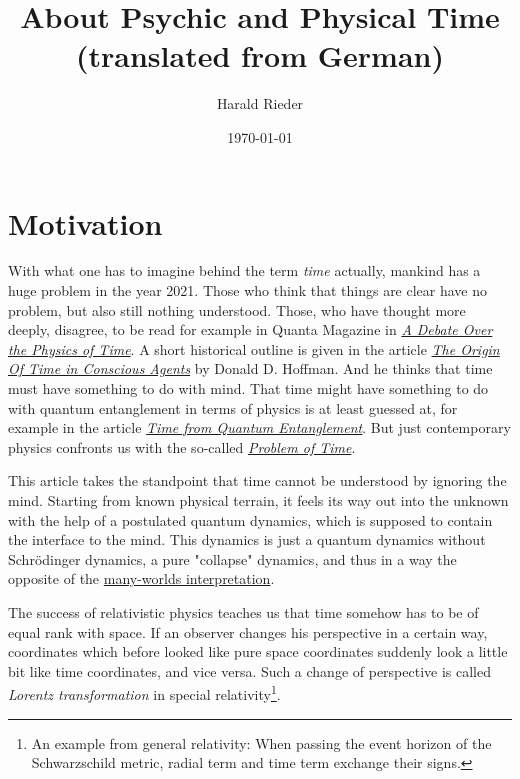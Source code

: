 \documentclass[12pt]{article}
\begin{document}
\title{\fontsize{25}{25}\selectfont \textbf{About Psychic and Physical Time} \\
\fontsize{12pt}{12pt}\selectfont (translated from German)}
\author{Harald Rieder}
\date{\today}
\maketitle



\tableofcontents

\section{Motivation}

With what one has to imagine behind the term \emph{time} actually, mankind has a huge problem in the year 2021. Those who think that things are clear have no problem, but also still nothing understood. Those, who have thought more deeply, disagree, to be read for example in Quanta Magazine in \emph{\href{https://www.quantamagazine.org/a-debate-over-the-physics-of-time-20160719/}{A Debate Over the Physics of Time}}. A short historical outline is given in the article \emph{\href{http://cogsci.uci.edu/~ddhoff/HoffmanTime.pdf}{The Origin Of Time in Conscious Agents}} by Donald D. Hoffman. And he thinks that time must have something to do with mind. That time might have something to do with quantum entanglement in terms of physics is at least guessed at, for example in the article \emph{\href{https://arxiv.org/abs/1310.4691}{Time from Quantum Entanglement}}. But just contemporary physics confronts us with the so-called \emph{\href{https://en.wikipedia.org/wiki/Problem_of_time}{Problem of Time}}. 

This article takes the standpoint that time cannot be understood by ignoring the mind. Starting from known physical terrain, it feels its way out into the unknown with the help of a postulated quantum dynamics, which is supposed to contain the interface to the mind. This dynamics is just a quantum dynamics without Schrödinger dynamics, a pure "collapse" dynamics, and thus in a way the opposite of the \href{https://en.wikipedia.org/wiki/Many-worlds_interpretation}{many-worlds interpretation}.

The success of relativistic physics teaches us that time somehow has to be of equal rank with space. If an observer changes his perspective in a certain way, coordinates which before looked like pure space coordinates suddenly look a little bit like time coordinates, and vice versa. Such a change of perspective is called \emph{Lorentz transformation} in special relativity\footnote{An example from general relativity: When passing the event horizon of the Schwarzschild metric, radial term and time term exchange their signs.}. 
\end{document}
